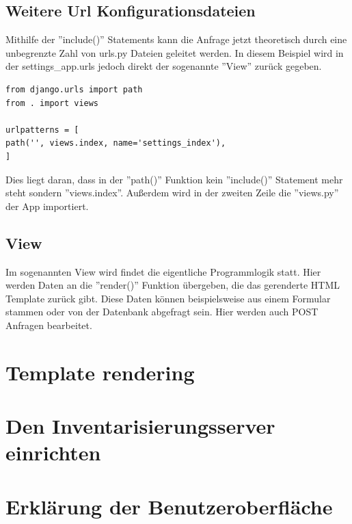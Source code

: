\documentclass{article}
\begin{document}
\subsection{Weitere Url Konfigurationsdateien}
Mithilfe der ''include()'' Statements kann die Anfrage jetzt theoretisch durch eine unbegrenzte Zahl von urls.py Dateien geleitet werden. In diesem Beispiel wird in der settings\_app.urls jedoch direkt der sogenannte ''View'' zurück gegeben.
\newpage
\begin{verbatim}
from django.urls import path
from . import views

urlpatterns = [
path('', views.index, name='settings_index'),
]
\end{verbatim}
Dies liegt daran, dass in der ''path()'' Funktion kein ''include()'' Statement mehr steht sondern ''views.index''. Außerdem wird in der zweiten Zeile die ''views.py'' der App importiert.
\subsection{View}
Im sogenannten View wird findet die eigentliche Programmlogik statt. Hier werden Daten an die ''render()'' Funktion übergeben, die das gerenderte HTML Template zurück gibt. Diese Daten können beispielsweise aus einem Formular stammen oder von der Datenbank abgefragt sein. Hier werden auch POST Anfragen bearbeitet.
\section{Template rendering}
\section{Den Inventarisierungsserver einrichten}
\section{Erklärung der Benutzeroberfläche}
\end{document}
